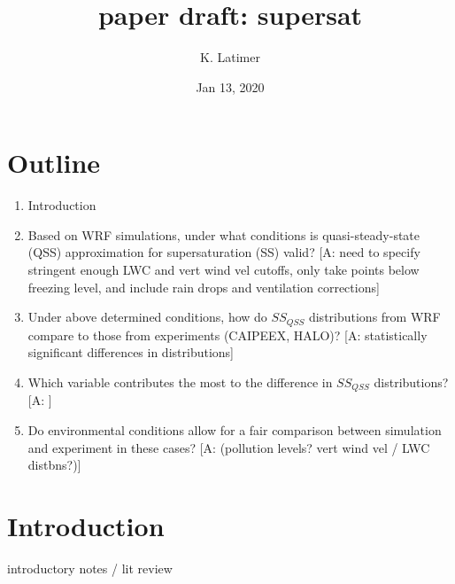 \documentclass{article}
\title{paper draft: supersat}
\author{K. Latimer}
\date{Jan 13, 2020}
\begin{document}
\maketitle
\setcounter{section}{-1}

\section{Outline}
	\begin{enumerate}
		\item Introduction
		\item Based on WRF simulations, under what conditions is quasi-steady-state (QSS) approximation for supersaturation (SS) valid? [A: need to specify stringent enough LWC and vert wind vel cutoffs, only take points below freezing level, and include rain drops and ventilation corrections]
		\item Under above determined conditions, how do $SS_{QSS}$ distributions from WRF compare to those from experiments (CAIPEEX, HALO)? [A: statistically significant differences in distributions]
		\item Which variable contributes the most to the difference in $SS_{QSS}$ distributions? [A: ]
		\item Do environmental conditions allow for a fair comparison between simulation and experiment in these cases? [A: (pollution levels? vert wind vel / LWC distbns?)]
	\end{enumerate}

\section{Introduction}
introductory notes / lit review 
\end{document}
